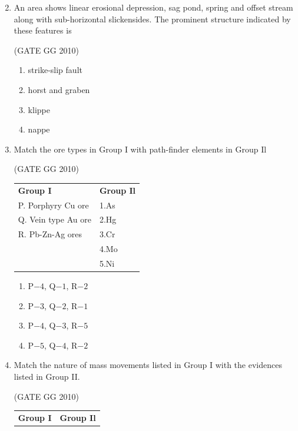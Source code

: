 \documentclass[journal]{IEEEtran}
\begin{document}
\begin{enumerate}
\begin{multicols}{2}
\end{multicols}

\item An area shows linear erosional depression, sag pond, spring and offset stream along with sub-horizontal slickensides. The prominent structure indicated by these features is

\hfill (GATE GG 2010)
\begin{multicols}{2}

\begin{enumerate}
    \item strike-slip fault
    \item horst and graben
    \item klippe
    \item nappe
\end{enumerate}
\end{multicols}

\item  Match the ore types  in Group I with path-finder elements in Group Il

(GATE GG 2010)\\
\begin{tabular}{ l l }
\textbf{Group I} & \textbf{Group Il}\\

P. Porphyry Cu ore & 1.As\\
Q. Vein type Au ore & 2.Hg\\ 
R. Pb-Zn-Ag ores & 3.Cr\\
& 4.Mo\\
& 5.Ni\\
\end{tabular}
\begin{multicols}{2}
\begin{enumerate}

\item P$- 4$, Q$- 1$, R$- 2$
\item P$- 3$, Q$- 2$, R$- 1$
\item P$- 4$, Q$- 3$, R$- 5$
\item P$- 5$, Q$- 4$, R$- 2$
\end{enumerate}
\end{multicols}


\item Match the nature of mass movements listed in Group I with the evidences listed in Group II.

\hfill (GATE GG 2010) \\
\begin{tabular}{ l l }
\textbf{Group I} & \textbf{Group Il}\\




\end{tabular}
\end{enumerate}
\end{document}
